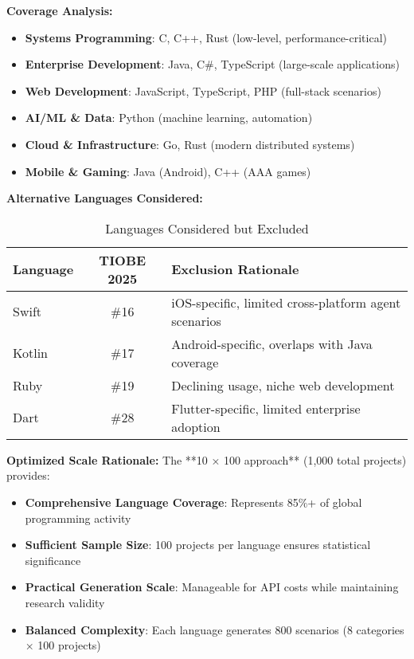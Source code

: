 \documentclass{article}
\begin{document}
\textbf{Coverage Analysis:}
\begin{itemize}
    \item \textbf{Systems Programming}: C, C++, Rust (low-level, performance-critical)
    \item \textbf{Enterprise Development}: Java, C\#, TypeScript (large-scale applications)
    \item \textbf{Web Development}: JavaScript, TypeScript, PHP (full-stack scenarios)
    \item \textbf{AI/ML \& Data}: Python (machine learning, automation)
    \item \textbf{Cloud \& Infrastructure}: Go, Rust (modern distributed systems)
    \item \textbf{Mobile \& Gaming}: Java (Android), C++ (AAA games)
\end{itemize}

\textbf{Alternative Languages Considered:}

\begin{table}[h]
\centering
\begin{tabular}{|l|c|l|}
\hline
\textbf{Language} & \textbf{TIOBE 2025} & \textbf{Exclusion Rationale} \\
\hline
Swift & \#16 & iOS-specific, limited cross-platform agent scenarios \\
Kotlin & \#17 & Android-specific, overlaps with Java coverage \\
Ruby & \#19 & Declining usage, niche web development \\
Dart & \#28 & Flutter-specific, limited enterprise adoption \\
\hline
\end{tabular}
\caption{Languages Considered but Excluded}
\end{table}

\textbf{Optimized Scale Rationale:}
The **10 × 100 approach** (1,000 total projects) provides:
\begin{itemize}
    \item \textbf{Comprehensive Language Coverage}: Represents 85\%+ of global programming activity
    \item \textbf{Sufficient Sample Size}: 100 projects per language ensures statistical significance
    \item \textbf{Practical Generation Scale}: Manageable for API costs while maintaining research validity
    \item \textbf{Balanced Complexity}: Each language generates 800 scenarios (8 categories × 100 projects)
\end{itemize}
\end{document}
